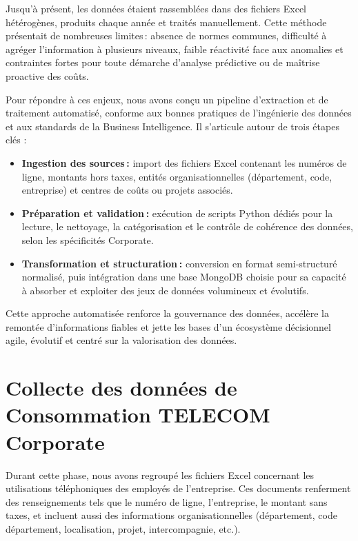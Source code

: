 \documentclass[a4paper,11pt]{report}
\begin{document}
Jusqu’à présent, les données étaient rassemblées dans des fichiers Excel hétérogènes, produits chaque année et traités manuellement. Cette méthode présentait de nombreuses limites : absence de normes communes, difficulté à agréger l’information à plusieurs niveaux, faible réactivité face aux anomalies et contraintes fortes pour toute démarche d’analyse prédictive ou de maîtrise proactive des coûts.

Pour répondre à ces enjeux, nous avons conçu un pipeline d’extraction et de traitement automatisé, conforme aux bonnes pratiques de l’ingénierie des données et aux standards de la Business Intelligence. Il s’articule autour de trois étapes clés :

\begin{itemize}
  \item \textbf{Ingestion des sources :} import des fichiers Excel contenant les numéros de ligne, montants hors taxes, entités organisationnelles (département, code, entreprise) et centres de coûts ou projets associés.
  
  \item \textbf{Préparation et validation :} exécution de scripts Python dédiés pour la lecture, le nettoyage, la catégorisation et le contrôle de cohérence des données, selon les spécificités Corporate.
  
  \item \textbf{Transformation et structuration :} conversion en format semi‑structuré normalisé, puis intégration dans une base MongoDB choisie pour sa capacité à absorber et exploiter des jeux de données volumineux et évolutifs.
\end{itemize}

\vspace{1em}
Cette approche automatisée renforce la gouvernance des données, accélère la remontée d’informations fiables et jette les bases d’un écosystème décisionnel agile, évolutif et centré sur la valorisation des données.

\section{Collecte des données de Consommation TELECOM Corporate}
Durant cette phase, nous avons regroupé les fichiers Excel concernant les utilisations téléphoniques des employés de l'entreprise. Ces documents renferment des renseignements tels que le numéro de ligne, l'entreprise, le montant sans taxes, et incluent aussi des informations organisationnelles (département, code département, localisation, projet, intercompagnie, etc.).
\end{document}
